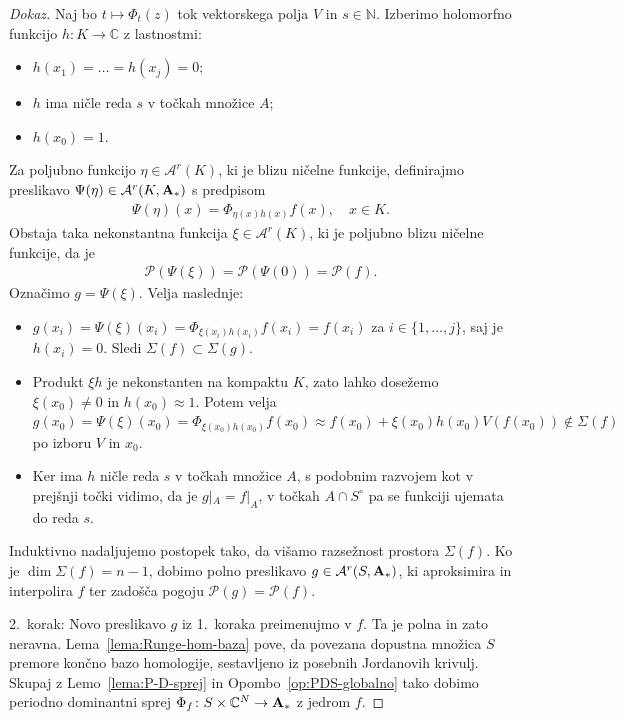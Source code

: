 \documentclass[12pt,a4paper,twoside]{article}
\theoremstyle{definition} %
\newenvironment{dokaz}[1][Dokaz]{\begin{proof}[#1]}{\end{proof}}
\theoremstyle{plain} %
\numberwithin{equation}{section}  %
\begin{document}
\begin{dokaz}
Naj bo $t \mapsto \Phi_{t}(z)$ tok vektorskega polja $V$ in $s \in \mathbb{N}$. 
Izberimo holomorfno funkcijo $h \colon K \to \mathbb{C}$ z lastnostmi:
\begin{itemize}
\item $h(x_{1}) = \dots = h(x_{j}) = 0$;
\item $h$ ima ničle reda $s$ v točkah množice $A$;
\item $h(x_0) = 1$.
\end{itemize}
Za poljubno funkcijo $\eta \in \mathcal{A}^{r}(K)$, ki je blizu ničelne funkcije, definirajmo preslikavo $\Psi (\eta) \in \mathcal{A}^{r}(K, \textbf{\textup{A}}_{*})$ s predpisom
\begin{gather}
\Psi (\eta)(x) = \Phi _{\eta(x) h(x)} f(x), \quad x \in K.
\end{gather}
Obstaja taka nekonstantna funkcija $\xi \in \mathcal{A}^{r}(K)$, ki je poljubno blizu ničelne funkcije, da je
\begin{gather*}
\mathcal{P}(\Psi (\xi)) = \mathcal{P}(\Psi(0)) = \mathcal{P}(f).
\end{gather*}
Označimo $g = \Psi(\xi)$. Velja naslednje:
\begin{itemize}
\item $g(x_{i}) = \Psi(\xi)(x_{i}) = \Phi_{\xi(x_{i}) h(x_{i})} f(x_{i}) = f(x_{i})$ za $i \in \{1, \dots , j \}$, saj je $h(x_{i})=0$. Sledi 
	$\Sigma(f) \subset \Sigma(g)$.
\item Produkt $\xi h$ je nekonstanten na kompaktu $K$, zato lahko dosežemo $\xi (x_0) \neq 0$ in $h(x_0) \approx 1.$ Potem velja
	$g(x_0) = \Psi(\xi)(x_0) = \Phi_{\xi(x_0) h(x_0)} f(x_0) \approx f(x_0) + \xi(x_0) h(x_0) V(f(x_0)) \notin \Sigma(f)$ po izboru $V$ in $x_0$.
\item Ker ima $h$ ničle reda $s$ v točkah množice $A$, s podobnim razvojem kot v prejšnji točki vidimo, da je $g|_{A} = f|_{A}$, v točkah $A \cap S^{\circ}$ pa se funkciji ujemata do reda $s$.
\end{itemize}
Induktivno nadaljujemo postopek tako, da višamo razsežnost prostora $\Sigma(f)$. Ko je $\dim \Sigma(f) = n-1$, dobimo polno preslikavo $g \in \mathcal{A}^{r}(S, \textbf{\textup{A}}_{*})$, ki aproksimira in interpolira $f$ ter zadošča pogoju $\mathcal{P}(g) = \mathcal{P}(f)$. \newline

2.~korak: Novo preslikavo $g$ iz 1.~koraka preimenujmo v $f$. Ta je polna in zato neravna.
Lema~\ref{lema:Runge-hom-baza} pove, da povezana dopustna množica $S$ premore končno bazo homologije, sestavljeno iz posebnih Jordanovih krivulj. Skupaj z Lemo~\ref{lema:P-D-sprej} in Opombo~\ref{op:PDS-globalno} tako dobimo periodno dominantni sprej $\Phi_{f} \colon S \times \mathbb{C}^{N} \to \textbf{\textup{A}}_{*}$ z jedrom $f$.


\end{dokaz}
\end{document}
